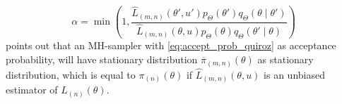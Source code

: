 \begin{equation}\label{eq:accept_prob_quiroz}
      \alpha = \min\left(1, \frac{\hat{L}_{\left(m,n\right)}\left(\theta', u'\right)p_{\Theta}\left(\theta'\right)q_{\Theta}\left(\theta\mid \theta'\right)}{\hat{L}_{\left(m,n\right)}\left(\theta, u\right)p_{\Theta}\left(\theta\right)q_{\Theta}\left(\theta'\mid \theta\right)}\right)
\end{equation}
\cite{quiroz2019speeding} points out that an MH-sampler with \eqref{eq:accept_prob_quiroz} as acceptance probability, will have stationary distribution $\overline{\pi}_{\left(m,n\right)}\left(\theta\right)$ as stationary distribution, which is equal to $\pi_{\left(n\right)}\left(\theta\right)$ if $\hat{L}_{\left(m,n\right)}\left(\theta, u\right)$ is an unbiased estimator of $L_{\left(n\right)}\left(\theta\right)$.